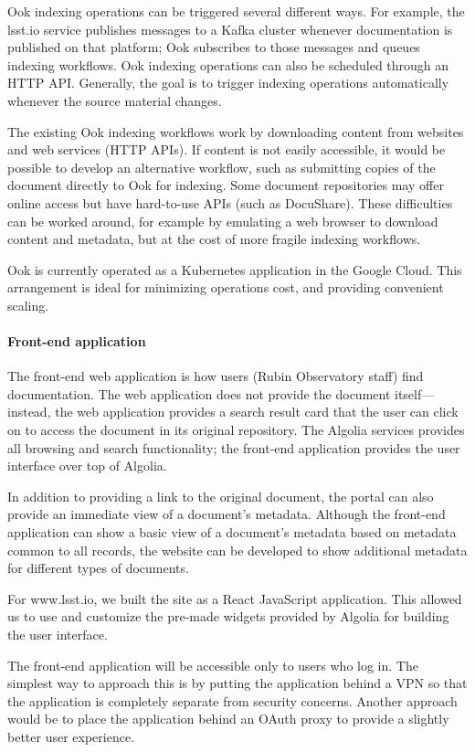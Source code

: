 Ook indexing operations can be triggered several different ways. For example, the lsst.io service publishes messages to a Kafka cluster whenever documentation is published on that platform; Ook subscribes to those messages and queues indexing workflows. Ook indexing operations can also be scheduled through an HTTP API. Generally, the goal is to trigger indexing operations automatically whenever the source material changes.

The existing Ook indexing workflows work by downloading content from websites and web services (HTTP APIs). If content is not easily accessible, it would be possible to develop an alternative workflow, such as submitting copies of the document directly to Ook for indexing. Some document repositories may offer online access but have hard-to-use APIs (such as DocuShare). These difficulties can be worked around, for example by emulating a web browser to download content and metadata, but at the cost of more fragile indexing workflows.

Ook is currently operated as a Kubernetes application in the Google Cloud. This arrangement is ideal for minimizing operations cost, and providing convenient scaling.

\paragraph{Front-end application}

The front-end web application is how users (Rubin Observatory staff) find documentation. The web application does not provide the document itself—instead, the web application provides a search result card that the user can click on to access the document in its original repository. The Algolia services provides all browsing and search functionality; the front-end application provides the user interface over top of Algolia.

In addition to providing a link to the original document, the portal can also provide an immediate view of a document's metadata. Although the front-end application can show a basic view of a document's metadata based on metadata common to all records, the website can be developed to show additional metadata for different types of documents.

For www.lsst.io, we built the site as a React JavaScript application. This allowed us to use and customize the pre-made widgets provided by Algolia for building the user interface.

The front-end application will be accessible only to users who log in. The simplest way to approach this is by putting the application behind a VPN so that the application is completely separate from security concerns. Another approach would be to place the application behind an OAuth proxy to provide a slightly better user experience.

